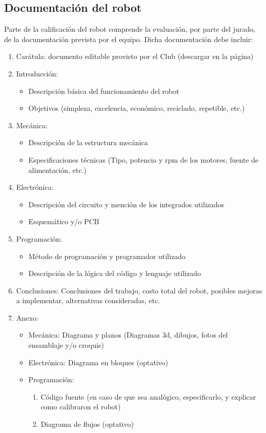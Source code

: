 \documentclass[a4paper,11pt]{article}
\begin{document}
\subsection*{Documentación del robot}
Parte de la calificación del robot comprende la evaluación, por parte del jurado, de la documentación prevista por el equipo.
Dicha documentación debe incluir:
\begin{enumerate}
  \item Carátula: documento editable provisto por el Club (descargar en la página) 
  \item Introducción:
  \begin{itemize}
    \item Descripción básica del funcionamiento del robot 
    \item Objetivos (simpleza, excelencia, económico, reciclado, repetible, etc.)
  \end{itemize}
  \item Mecánica:
  \begin{itemize}
    \item Descripción de la estructura mecánica
    \item Especificaciones técnicas (Tipo, potencia y rpm de los motores, fuente de alimentación, etc.)
  \end{itemize}
  \item Electrónica:
  \begin{itemize}
    \item Descripción del circuito y mención de los integrados utilizados
    \item Esquemático y/o PCB 
  \end{itemize}
  \item Programación:
  \begin{itemize}
    \item Método de programación y programador utilizado
    \item Descripción de la lógica del código y lenguaje utilizado 
  \end{itemize}
  \item Conclusiones: Conclusiones del trabajo, costo total del robot, posibles mejoras a implementar, alternativas consideradas, etc.
  \item Anexo:
  \begin{itemize}
    \item Mecánica: Diagrama y planos (Diagramas 3d, dibujos, fotos del ensamblaje y/o croquis)
    \item Electrónica: Diagrama en bloques (optativo)
    \item Programación: 
    \begin{enumerate}
      \item Código fuente (en caso de que sea analógico, especificarlo, y explicar como calibraron el robot)
      \item Diagrama de flujos (optativo)
    \end{enumerate}
  \end{itemize}
\end{enumerate}
\end{document}
